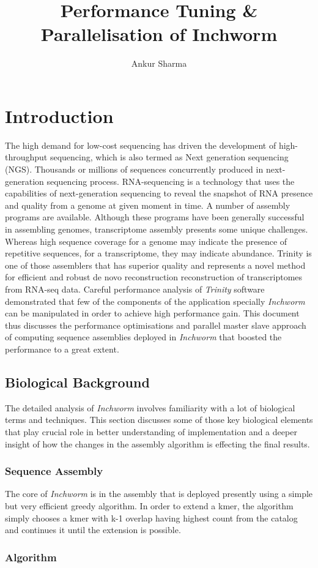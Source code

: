 \documentclass[plainarticle,zihtitle,english,final,hyperref,utf8]{zihpub}
\author{Ankur Sharma}
\title{Performance Tuning \& Parallelisation of Inchworm}
\begin{document}
\section{Introduction} The high demand for low-cost sequencing has driven the development of high-throughput sequencing, which is also termed as Next generation sequencing (NGS). Thousands or millions of sequences concurrently produced in next-generation sequencing process. RNA-sequencing is a technology that uses the capabilities of next-generation sequencing to reveal the snapshot of RNA presence and quality from a genome at given moment in time. A number of assembly programs are available. Although these programs have been generally successful in assembling genomes, transcriptome assembly presents some unique challenges. Whereas high sequence coverage for a genome may indicate the presence of repetitive sequences, for a transcriptome, they may indicate abundance. Trinity is one of those assemblers that has superior quality and represents a novel method for efficient and robust de novo reconstruction reconstruction of transcriptomes from RNA-seq data. Careful performance analysis of \emph{Trinity} software demonstrated that few of the components of the application specially \emph{Inchworm} can be manipulated in order to achieve high performance gain. This document thus discusses the performance optimisations and parallel master slave approach of computing sequence assemblies deployed in \emph{Inchworm} that boosted the performance to a great extent.
\subsection{Biological Background}
The detailed analysis of \emph{Inchworm} involves familiarity with a lot of biological terms and techniques. This section discusses some of those key biological elements that play crucial role in better understanding of implementation and a deeper insight of how the changes in the assembly algorithm is effecting the final results.
\subsubsection{Sequence Assembly}
The core of \emph{Inchworm} is in the assembly that is deployed presently using a simple but very efficient greedy algorithm. In order to extend a kmer, the algorithm simply chooses a kmer with k-1 overlap having highest count from the catalog and continues it until the extension is possible.
\subsubsection{Algorithm}
\end{document}
